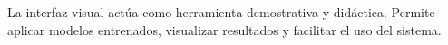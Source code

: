 La interfaz visual actúa como herramienta demostrativa y didáctica. Permite aplicar modelos entrenados, visualizar resultados y facilitar el uso del sistema.